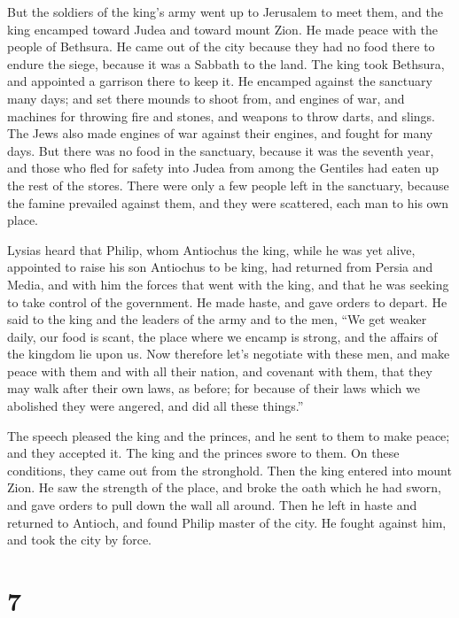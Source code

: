  But the soldiers of the king's army went up to Jerusalem
to meet them, and the king encamped toward Judea and toward mount Zion.
 He made peace with the people of Bethsura. He came out of
the city because they had no food there to endure the siege, because it
was a Sabbath to the land.  The king took Bethsura, and
appointed a garrison there to keep it.  He encamped against
the sanctuary many days; and set there mounds to shoot from, and engines
of war, and machines for throwing fire and stones, and weapons to throw
darts, and slings.  The Jews also made engines of war
against their engines, and fought for many days.  But there
was no food in the sanctuary, because it was the seventh year, and those
who fled for safety into Judea from among the Gentiles had eaten up the
rest of the stores.  There were only a few people left in
the sanctuary, because the famine prevailed against them, and they were
scattered, each man to his own place.

 Lysias heard that Philip, whom Antiochus the king, while
he was yet alive, appointed to raise his son Antiochus to be king,
 had returned from Persia and Media, and with him the
forces that went with the king, and that he was seeking to take control
of the government.  He made haste, and gave orders to
depart. He said to the king and the leaders of the army and to the men,
``We get weaker daily, our food is scant, the place where we encamp is
strong, and the affairs of the kingdom lie upon us.  Now
therefore let's negotiate with these men, and make peace with them and
with all their nation,  and covenant with them, that they
may walk after their own laws, as before; for because of their laws
which we abolished they were angered, and did all these things.''

 The speech pleased the king and the princes, and he sent
to them to make peace; and they accepted it.  The king and
the princes swore to them. On these conditions, they came out from the
stronghold.  Then the king entered into mount Zion. He saw
the strength of the place, and broke the oath which he had sworn, and
gave orders to pull down the wall all around.  Then he left
in haste and returned to Antioch, and found Philip master of the city.
He fought against him, and took the city by force.

\hypertarget{section-6}{%
\section{7}\label{section-6}}

